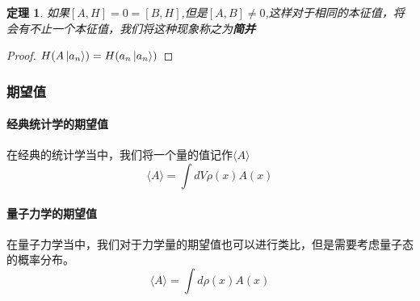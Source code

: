 \documentclass{article}
\newtheorem{theorem}{定理}
\begin{document}
\begin{theorem}
	如果$[A,H]=0=[B,H]$,但是$[A,B]\neq0$,这样对于相同的本征值，将会有不止一个本征值，我们将这种现象称之为\textbf{简并}
\end{theorem}

\begin{proof}
	$H(A\ket{a_n})=H(a_n\ket{a_n})$
\end{proof}

\subsubsection{期望值}
\paragraph{经典统计学的期望值}
在经典的统计学当中，我们将一个量的值记作$\langle A\rangle$
\begin{equation}
	\langle A\rangle=\int dV\rho(x)A(x)
\end{equation}
\paragraph{量子力学的期望值}
在量子力学当中，我们对于力学量的期望值也可以进行类比，但是需要考虑量子态的概率分布。
\begin{equation}
	\langle A\rangle=\int d\rho(x)A(x)
\end{equation}
\end{document}
